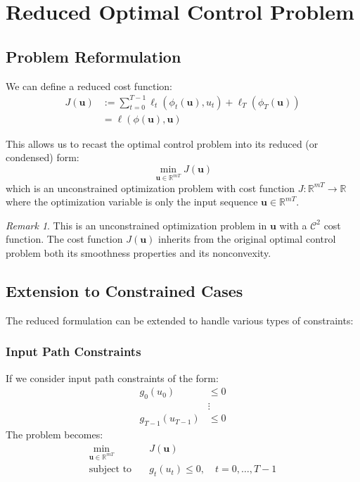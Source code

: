\documentclass[openany]{book}
\theoremstyle{definition}
\theoremstyle{remark}
\newtheorem*{remark}{Remark}
\begin{document}
\section{Reduced Optimal Control Problem}\label{shoot}

\subsection{Problem Reformulation}
We can define a reduced cost function:
\begin{align*}
    J(\mathbf{u}) &:= \sum_{t=0}^{T-1}\ell_t(\phi_t(\mathbf{u}), u_t) + \ell_T(\phi_T(\mathbf{u}))\\
    &= \ell(\phi(\mathbf{u}), \mathbf{u})
\end{align*}

This allows us to recast the optimal control problem into its reduced (or condensed) form:
\[
    \min_{\mathbf{u}\in\mathbb{R}^{mT}} J(\mathbf{u})
\]
which is an unconstrained optimization problem with cost function $J: \mathbb{R}^{mT} \to \mathbb{R}$ where the optimization variable is only the input sequence $\mathbf{u} \in \mathbb{R}^{mT}$.

\begin{remark}
This is an unconstrained optimization problem in $\mathbf{u}$ with a $\mathcal{C}^2$ cost function. The cost function $J(\mathbf{u})$ inherits from the original optimal control problem both its smoothness properties and its nonconvexity.
\end{remark}

\subsection{Extension to Constrained Cases}
The reduced formulation can be extended to handle various types of constraints:

\subsubsection{Input Path Constraints}
If we consider input path constraints of the form:
\begin{align*}
    g_0(u_0) &\leq 0 \\
    &\vdots \\
    g_{T-1}(u_{T-1}) &\leq 0
\end{align*}
The problem becomes:
\begin{align*}
    \min_{\mathbf{u}\in\mathbb{R}^{mT}} \quad & J(\mathbf{u}) \\
    \text{subject to} \quad & g_t(u_t) \leq 0, \quad t = 0,\ldots,T-1
\end{align*}
\end{document}
